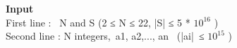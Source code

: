 \textbf{\textbf{Input }}
\\First line :  N and S (2 ≤ N ≤ 22, |S| ≤ 5 * $10^{16}$ )
\\Second line : N integers, a1, a2,..., an  (|ai| ≤ $10^{15}$ )

 